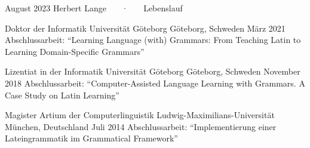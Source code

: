 \documentclass[11pt, a4]{academic-cv}
\begin{document}
\makecvheader
\makecvfooter
{ August 2023 }
{ Herbert Lange ~~~·~~~ Lebenslauf}
{\thepage}


\vspace{-10px}

\begin{cventries}
\cventry
{Doktor der Informatik} %
{ Universität Göteborg} %
{Göteborg, Schweden} %
{März 2021} %
{Abschlussarbeit: ``Learning Language (with) Grammars: From Teaching Latin to Learning Domain-Specific Grammars''}

\cventry
{Lizentiat in der Informatik} %
{ Universität Göteborg} %
{Göteborg, Schweden} %
{November 2018} %
{Abschlussarbeit: ``Computer-Assisted Language Learning with Grammars. A Case Study on Latin Learning''}

\cventry
{Magister Artium der Computerlinguistik} %
{ Ludwig-Maximilians-Universität} %
{München, Deutschland} %
{Juli 2014} %
{Abschlussarbeit: ``Implementierung einer Lateingrammatik im Grammatical Framework''}


\end{cventries}
\vspace{-10px}
\end{document}

